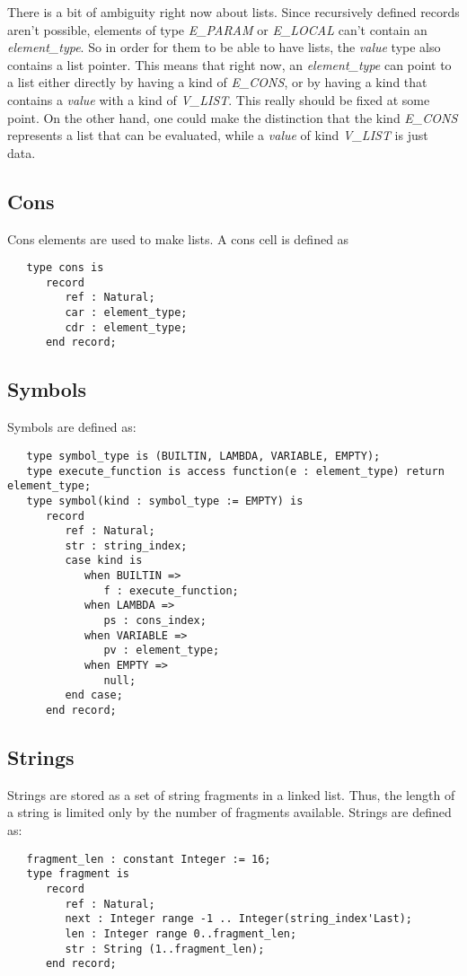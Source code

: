 \documentclass[10pt, openany]{book}
\begin{document}
There is a bit of ambiguity right now about lists.  Since recursively defined records aren't possible, elements of type \emph{E\_PARAM} or \emph{E\_LOCAL} can't contain an \emph{element\_type}.  So in order for them to be able to have lists, the \emph{value} type also contains a list pointer.  This means that right now, an \emph{element\_type} can point to a list either directly by having a kind of \emph{E\_CONS}, or by having a kind that contains a \emph{value} with a kind of \emph{V\_LIST}.  This really should be fixed at some point.  On the other hand, one could make the distinction that the kind \emph{E\_CONS} represents a list that can be evaluated, while a \emph{value} of kind \emph{V\_LIST} is just data.

\subsection{Cons}
Cons elements are used to make lists.  A cons cell is defined as
\begin{lstlisting}
   type cons is
      record
         ref : Natural;
         car : element_type;
         cdr : element_type;
      end record;
\end{lstlisting}

\subsection{Symbols}
Symbols are defined as:
\begin{lstlisting}
   type symbol_type is (BUILTIN, LAMBDA, VARIABLE, EMPTY);
   type execute_function is access function(e : element_type) return element_type;
   type symbol(kind : symbol_type := EMPTY) is
      record
         ref : Natural;
         str : string_index;
         case kind is
            when BUILTIN =>
               f : execute_function;
            when LAMBDA =>
               ps : cons_index;
            when VARIABLE =>
               pv : element_type;
            when EMPTY =>
               null;
         end case;
      end record;
\end{lstlisting}

\subsection{Strings}
Strings are stored as a set of string fragments in a linked list.  Thus, the length of a string is limited only by the number of fragments available.  Strings are defined as:
\begin{lstlisting}
   fragment_len : constant Integer := 16;
   type fragment is
      record
         ref : Natural;
         next : Integer range -1 .. Integer(string_index'Last);
         len : Integer range 0..fragment_len;
         str : String (1..fragment_len);
      end record;
\end{lstlisting}
\end{document}
